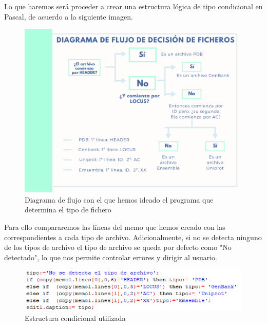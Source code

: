 \documentclass[12pt]{article}
\begin{document}
Lo que haremos será proceder a crear una estructura lógica de tipo condicional en Pascal, de acuerdo a la siguiente imagen.

\begin{figure}[H]
\centering
\includegraphics[scale=0.5]{Guía de decisión de ficheros}
\caption{Diagrama de flujo con el que hemos ideado el programa que determina el tipo de fichero}
\end{figure}

Para ello compararemos las líneas del memo que hemos creado con las correspondientes a cada tipo de archivo. Adicionalmente, si no se detecta ninguno de los tipos de archivo el tipo de archivo se queda por defecto como "No detectado", lo que nos permite controlar errores y dirigir al usuario.
\newline

\begin{figure}[H]
\centering
\includegraphics[scale=1]{Screenshot_25}
\caption{Estructura condicional utilizada}
\end{figure}
\end{document}
